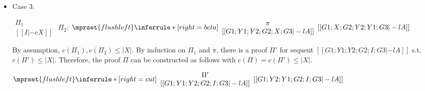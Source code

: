 \begin{itemize}
\item Case 3:
      \begin{center}
        \scriptsize
        \begin{math}
          \begin{array}{c}
            \Pi_1 \\
            {[[I |-c X]]}
          \end{array}
        \end{math}
        \qquad\qquad
        $\Pi_2$:
        \begin{math}
          $$\mprset{flushleft}
          \inferrule* [right={\tiny beta}] {
            {
              \begin{array}{c}
                \pi \\
                {[[G1; Y1; Y2; G2; X; G3 |-l A]]}
              \end{array}
            }
          }{[[G1; X; G2; Y2; Y1; G3 |-l A]]}
        \end{math}
      \end{center}
      By assumption, $c(\Pi_1),c(\Pi_2)\leq |X|$. By induction on $\Pi_1$
      and $\pi$, there is a proof $\Pi'$ for sequent
      $[[G1; Y1; Y2; G2; I; G3 |-l A]]$ s.t. $c(\Pi') \leq |X|$. Therefore,
      the proof $\Pi$ can be constructed as follows with
      $c(\Pi) = c(\Pi') \leq |X|$.
      \begin{center}
        \scriptsize
        \begin{math}
          $$\mprset{flushleft}
          \inferrule* [right={\tiny cut}] {
            {
              \begin{array}{cc}
                \Pi' \\
                {[[G1; Y1; Y2; G2; I; G3 |-l A]]}
              \end{array}
            }
          }{[[G1; Y2; Y1; G2; I; G3 |-l A]]}
        \end{math}
      \end{center}


\end{itemize}

